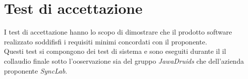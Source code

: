 {{{\begin{center}
		\end{center}

\section{Test di accettazione}\label{SpecificaDeiTestTestDiAccettazione}
I test di accettazione hanno lo scopo di dimostrare che il prodotto software realizzato soddifisfi i requisiti minimi concordati con il proponente. \\
Questi test si compongono dei test di sistema e sono eseguiti durante il il collaudio finale sotto l'ooservazione sia del gruppo \textit{JawaDruids} che dell'azienda proponente \textit{SyncLab}.

\def\tabularxcolumn#1{m{#1}}
{
	
}}}}
